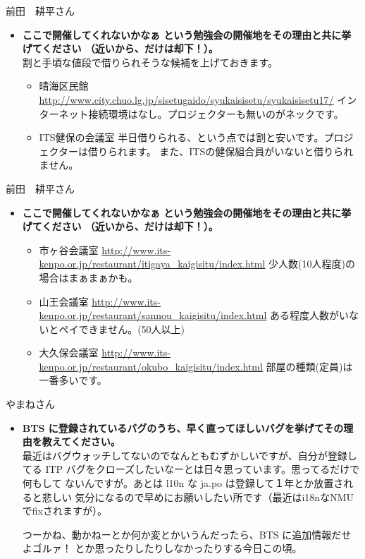\documentclass[cjk,dvipdfmx,12pt]{beamer}
\begin{document}
\begin{frame}{前田　耕平さん}
\begin{itemize}
\item {\bf ここで開催してくれないかなぁ という勉強会の開催地をその理由と共に挙げてください （近いから、だけは却下！）。}
\\
割と手頃な値段で借りられそうな候補を上げておきます。
\begin{itemize}
\item 晴海区民館
\url{http://www.city.chuo.lg.jp/sisetugaido/syukaisisetu/syukaisisetu17/}
インターネット接続環境はなし。プロジェクターも無いのがネックです。

\item ITS健保の会議室
半日借りられる、という点では割と安いです。プロジェクターは借りられます。
また、ITSの健保組合員がいないと借りられません。
\end{itemize}
\end{itemize}
\end{frame}

\begin{frame}{前田　耕平さん}
\begin{itemize}
\item {\bf ここで開催してくれないかなぁ という勉強会の開催地をその理由と共に挙げてください （近いから、だけは却下！）。}
\\
\begin{itemize}
\item 市ヶ谷会議室
\url{http://www.its-kenpo.or.jp/restaurant/itigaya_kaigisitu/index.html}
少人数(10人程度)の場合はまぁまぁかも。

\item 山王会議室
\url{http://www.its-kenpo.or.jp/restaurant/sannou_kaigisitu/index.html}
ある程度人数がいないとペイできません。(50人以上)

\item 大久保会議室
\url{http://www.its-kenpo.or.jp/restaurant/okubo_kaigisitu/index.html}
部屋の種類(定員)は一番多いです。

\end{itemize}
\end{itemize}
\end{frame}

\begin{frame}{やまねさん}
\begin{itemize}
\item {\bf BTS に登録されているバグのうち、早く直ってほしいバグを挙げてその理由を教えてください。}
\\
最近はバグウォッチしてないのでなんともむずかしいですが、自分が登録してる
ITP バグをクローズしたいなーとは日々思っています。思ってるだけで何もして
ないんですが。あとは l10n な ja.po は登録して１年とか放置されると悲しい
気分になるので早めにお願いしたい所です（最近はi18nなNMUでfixされますが）。

つーかね、動かねーとか何か変とかいうんだったら、BTS に追加情報だせよゴルァ！
とか思ったりしたりしなかったりする今日この頃。
\end{itemize}
\end{frame}
\end{document}
